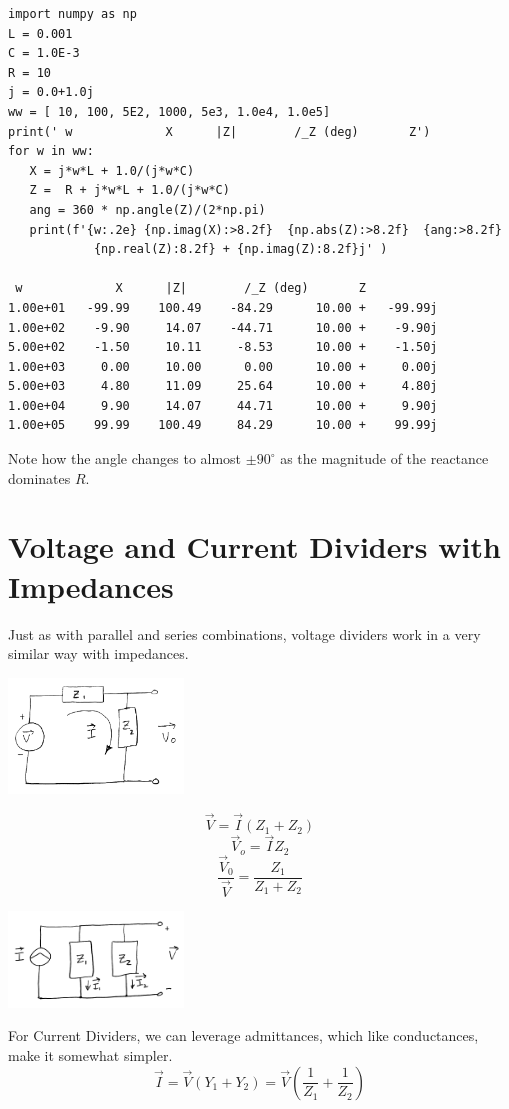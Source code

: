 \begin{verbatim}import numpy as np
L = 0.001
C = 1.0E-3
R = 10
j = 0.0+1.0j
ww = [ 10, 100, 5E2, 1000, 5e3, 1.0e4, 1.0e5]
print(' w             X      |Z|        /_Z (deg)       Z')
for w in ww:
   X = j*w*L + 1.0/(j*w*C)
   Z =  R + j*w*L + 1.0/(j*w*C)
   ang = 360 * np.angle(Z)/(2*np.pi)
   print(f'{w:.2e} {np.imag(X):>8.2f}  {np.abs(Z):>8.2f}  {ang:>8.2f}
            {np.real(Z):8.2f} + {np.imag(Z):8.2f}j' )

 w             X      |Z|        /_Z (deg)       Z
1.00e+01   -99.99    100.49    -84.29      10.00 +   -99.99j
1.00e+02    -9.90     14.07    -44.71      10.00 +    -9.90j
5.00e+02    -1.50     10.11     -8.53      10.00 +    -1.50j
1.00e+03     0.00     10.00      0.00      10.00 +     0.00j
5.00e+03     4.80     11.09     25.64      10.00 +     4.80j
1.00e+04     9.90     14.07     44.71      10.00 +     9.90j
1.00e+05    99.99    100.49     84.29      10.00 +    99.99j
\end{verbatim}

Note how the angle changes to almost $\pm90^\circ$ as the magnitude of the reactance dominates $R$.

\section{Voltage and Current Dividers with Impedances}
Just as with parallel and series combinations, voltage dividers work in a very similar way with impedances.


\includegraphics[width=0.35\textwidth]{figsChapt02/CT64010.png}

\[
\vec{V} = \vec{I}(Z_1+Z_2)
\]
\[
\vec{V}_o = \vec{I} Z_2
\]
\[
\frac {\vec{V}_0 } {\vec{V}} = \frac {Z_1}  {Z_1+Z_2}
\]

\includegraphics[width=0.35\textwidth]{figsChapt02/LE10258.png}

For Current Dividers, we can leverage admittances, which like conductances, make it somewhat simpler.
\[
\vec{I} = \vec{V}(Y_1+Y_2) = \vec{V}(\frac {1}  {Z_1} + \frac {1}  {Z_2}  )
\]


